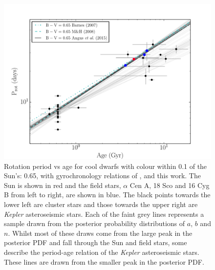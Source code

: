\documentclass[useAMS, usenatbib]{mn2e}
\begin{document}
\begin{figure}
\begin{center}
\includegraphics[width=6in, clip=true, trim=0 0 0.5in 0]{p_vs_a_solar.pdf}
\caption{Rotation period vs age for cool dwarfs with colour within 0.1 of the
	Sun's: 0.65, with gyrochronology relations of \citet{Barnes2007},
	\citet{Mamajek2008} and this work.
	The Sun is shown in red and the
	field stars, $\alpha$ Cen A, 18 Sco and 16 Cyg B from left to right,
	are shown in blue.
	The black points towards the lower left are cluster stars and those
	towards the upper right are {\it Kepler} asteroseismic stars.
	Each of the faint grey lines represents a
	sample drawn from the posterior probability distributions of $a$, $b$
	and $n$.
	Whilst most of these draws come from the large peak in the posterior
	PDF and fall through the Sun and field stars, some describe the
	period-age relation of the {\it Kepler} asteroseismic stars.
	These lines are drawn from the smaller peak in the posterior PDF.
\label{fig:p_vs_a_solar}}
\end{center}
\end{figure}
\end{document}
